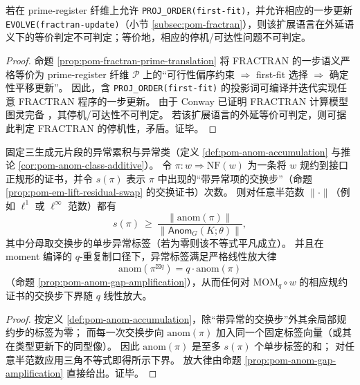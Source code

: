 \begin{theorem}\label{thm:pom-firstfit-extensional-undecidable}
若在 prime-register 纤维上允许 \texttt{PROJ\_ORDER(first-fit)}，并允许相应的一步更新 \texttt{EVOLVE(fractran-update)}（小节 \ref{subsec:pom-fractran}），则该扩展语言在外延语义下的等价判定不可判定；等价地，相应的停机/可达性问题不可判定。
\end{theorem}
\begin{proof}
命题 \ref{prop:pom-fractran-prime-translation} 将 FRACTRAN 的一步语义严格等价为 prime-register 纤维 \(\mathcal{P}\) 上的“可行性偏序约束 \(\Rightarrow\) first-fit 选择 \(\Rightarrow\) 确定性平移更新”。
因此，含 \texttt{PROJ\_ORDER(first-fit)} 的投影词可编译并迭代实现任意 FRACTRAN 程序的一步更新。
由于 Conway 已证明 FRACTRAN 计算模型图灵完备 \cite{Conway1987FRACTRAN}，其停机/可达性不可判定。
若该扩展语言的外延等价可判定，则可据此判定 FRACTRAN 的停机性，矛盾。证毕。
\end{proof}

\begin{proposition}\label{prop:pom-anom-swap-lowerbound-and-mom-amplify}
固定三生成元片段的异常累积与异常类（定义 \ref{def:pom-anom-accumulation} 与推论 \ref{cor:pom-anom-class-additive}）。
令 \(\pi:w\Rightarrow \mathrm{NF}(w)\) 为一条将 \(w\) 规约到接口正规形的证书，并令 \(s(\pi)\) 表示 \(\pi\) 中出现的“带异常项的交换步”（命题 \ref{prop:pom-em-lift-residual-swap} 的交换证书）次数。
则对任意半范数 \(\|\cdot\|\)（例如 \(\ell^1\) 或 \(\ell^\infty\) 范数）都有
\[
s(\pi)\ \ge\ \frac{\bigl\|\mathrm{anom}(\pi)\bigr\|}{\bigl\|\mathsf{Anom}_G(K;\theta)\bigr\|},
\]
其中分母取交换步的单步异常标签（若为零则该不等式平凡成立）。
并且在 moment 编译的 \(q\)-重复制口径下，异常标签满足严格线性放大律
\[
\mathrm{anom}(\pi^{\boxtimes q})=q\cdot \mathrm{anom}(\pi)
\]
（命题 \ref{prop:pom-anom-gap-amplification}），从而任何对 \(\mathrm{MOM}_q\circ w\) 的相应规约证书的交换步下界随 \(q\) 线性放大。
\end{proposition}
\begin{proof}
按定义 \ref{def:pom-anom-accumulation}，除“带异常的交换步”外其余局部规约步的标签为零；
而每一次交换步向 \(\mathrm{anom}(\pi)\) 加入同一个固定标签向量（或其在类型更新下的同型像）。
因此 \(\mathrm{anom}(\pi)\) 是至多 \(s(\pi)\) 个单步标签的和；
对任意半范数应用三角不等式即得所示下界。
放大律由命题 \ref{prop:pom-anom-gap-amplification} 直接给出。证毕。
\end{proof}
